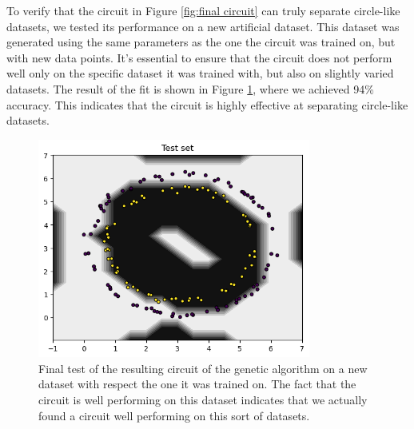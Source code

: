 \documentclass[12pt]{article}
\begin{document}
To verify that the circuit in Figure \ref{fig:final circuit} can truly separate circle-like datasets, we tested its performance on a new artificial dataset. This dataset was generated using the same parameters as the one the circuit was trained on, but with new data points. It's essential to ensure that the circuit does not perform well only on the specific dataset it was trained with, but also on slightly varied datasets. The result of the fit is shown in Figure \ref{fig:awesome}, where we achieved 94\% accuracy. This indicates that the circuit is highly effective at separating circle-like datasets.
\begin{figure}[h!]
    \centering
    \includegraphics[width=0.8\textwidth]{images/awesomeresult.png}
    \caption{Final test of the resulting circuit of the genetic algorithm on a new dataset with respect the one it was trained on. The fact that the circuit is well performing on this dataset indicates that we actually found a circuit well performing on this sort of datasets.}
    \label{fig:awesome}
\end{figure}
\end{document}
